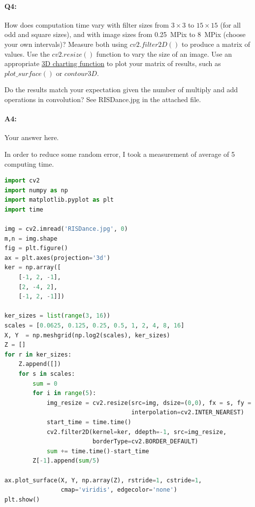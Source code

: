 	\paragraph{Q4:} How does computation time vary with filter sizes from $3\times3$ to $15\times15$ (for all odd and square sizes), and with image sizes from 0.25~MPix to 8~MPix (choose your own intervals)? Measure both using \href{https://docs.opencv.org/4.5.0/d4/d86/group__imgproc__filter.html#ga27c049795ce870216ddfb366086b5a04}{$cv2.filter2D()$} to produce a matrix of values. Use the \href{https://docs.opencv.org/4.5.3/da/d54/group__imgproc__transform.html#ga47a974309e9102f5f08231edc7e7529d}{$cv2.resize()$} function to vary the size of an image.
	Use an appropriate \href{https://jakevdp.github.io/PythonDataScienceHandbook/04.12-three-dimensional-plotting.html#Three-dimensional-Contour-Plots}{3D charting function} to plot your matrix of results, such as $plot\_surface()$ or $contour3D$.
	
	Do the results match your expectation given the number of multiply and add operations in convolution?
	See RISDance.jpg in the attached file.
	
	\paragraph{A4:} Your answer here.

 	In order to reduce some random error, I took a measurement of average of 5 computing time.
	\begin{lstlisting}[language=Python]
import cv2
import numpy as np
import matplotlib.pyplot as plt
import time

img = cv2.imread('RISDance.jpg', 0)
m,n = img.shape
fig = plt.figure()
ax = plt.axes(projection='3d')
ker = np.array([
    [-1, 2, -1],
    [2, -4, 2],
    [-1, 2, -1]])

ker_sizes = list(range(3, 16))
scales = [0.0625, 0.125, 0.25, 0.5, 1, 2, 4, 8, 16]
X, Y  = np.meshgrid(np.log2(scales), ker_sizes)
Z = []
for r in ker_sizes:
    Z.append([])
    for s in scales:
        sum = 0
        for i in range(5):
            img_resize = cv2.resize(src=img, dsize=(0,0), fx = s, fy = s,
                                    interpolation=cv2.INTER_NEAREST)
            start_time = time.time()
            cv2.filter2D(kernel=ker, ddepth=-1, src=img_resize,
                         borderType=cv2.BORDER_DEFAULT)
            sum += time.time()-start_time
        Z[-1].append(sum/5)

ax.plot_surface(X, Y, np.array(Z), rstride=1, cstride=1,
                cmap='viridis', edgecolor='none')
plt.show()
	\end{lstlisting}

